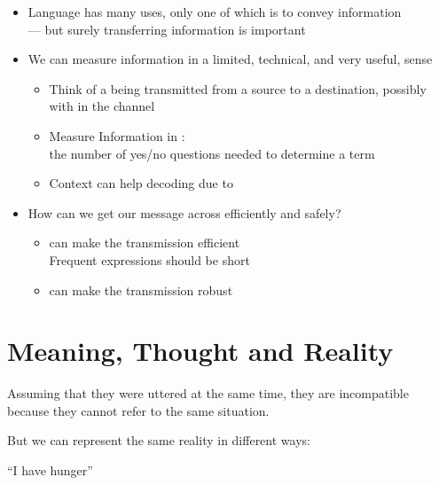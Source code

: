 \documentclass[headrule,footrule]{foils}
\begin{document}
\begin{itemize}
\item Language has many uses, only one of which is to convey information
  \\ --- but surely transferring information is important
\item We can measure information in a limited, technical, and very useful, sense
  \begin{itemize}
  \item Think of a  being transmitted from a source to a
    destination, possibly with  in the channel
  \item Measure Information in : 
    \\ the number of yes/no questions needed to determine a term
  \item Context can help decoding due to 
  \end{itemize}
\newpage 
\item How can we get our message across efficiently and safely?
  \begin{itemize}
  \item {} can make the transmission efficient
    \\ Frequent expressions should be short
  \item {} can make the transmission robust
  \end{itemize}
\end{itemize}

\section{Meaning, Thought and Reality}
\MyLogo{}



\begin{exe}
  \ex {}
  \ex {}
\end{exe}

Assuming that they were uttered at the same time, they are
incompatible because they cannot refer to the same
situation. 

But we can represent the same reality in different ways:

\begin{exe}
  \ex {} ``I have hunger''
  \ex {}
\end{exe}
\end{document}
